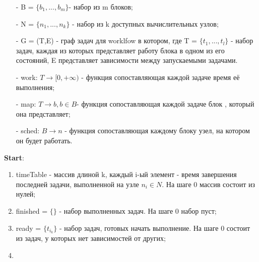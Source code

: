 \documentclass[a4paper,12pt]{article}
\begin{document}
\begin{algorithm}[!h]
\scriptsize
\caption{\label{alg:time_calc} вычисления времени выполнения worklfow, при фиксированном распределении блоков по узлам}
\SetAlgoLined
{}
\begin{enumerate}
\item[-] B = $\lbrace b_{1}, ..., b_{m}\rbrace$- набор из m блоков;
\item[-] N = $\lbrace n_{1}, ..., n_{k}\rbrace$ - набор из k доступных вычислительных узлов;
\item[-] G = (T,E) - граф задач для worklfow в котором, где T = $\lbrace t_{1}, ..., t_{l}\rbrace$ - набор задач, каждая из которых представляет работу блока в одном из его состояний, E представляет зависимости между запускаемыми задачами.
\item[-] work: $T \rightarrow [0, +\infty) $ - функция сопоставляющая каждой задаче время её выполнения;
\item[-] map: $T \rightarrow b, b \in B $- функция сопоставляющая каждой задаче блок , который она представляет;
\item[-] sched: $B \rightarrow n$ - функция сопоставляющая каждому блоку узел, на котором он будет работать.
\end{enumerate}

\textbf{Start}:\\
\begin{enumerate}
\item timeTable - массив длиной k, каждый  i-ый элемент - время завершения последней задачи, выполненной на узле $n_{i} \in N$. На шаге 0 массив состоит из нулей;
\item finished  = $\lbrace\rbrace$ - набор выполненных задач. На шаге 0 набор пуст;
\item ready =  $\lbrace t_{i_{k}}\rbrace$ - набор задач, готовых начать выполнение. На шаге 0 состоит из задач, у которых нет зависимостей от других;
\item 
{}
\end{enumerate}


\end{algorithm}	
\end{document}

